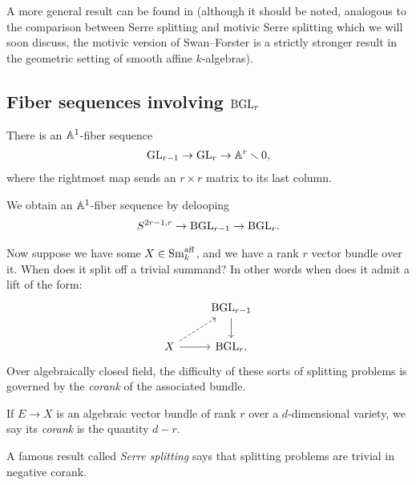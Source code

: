 \documentclass[11pt,openany]{book}
\providecommand{\aff}{\mathrm{aff}}
\begin{document}
\begin{remark} A more general result can be found in \cite{Swan-gens} (although it should be noted, analogous to the comparison between Serre splitting and motivic Serre splitting which we will soon discuss, the motivic version of Swan--Forster is a strictly stronger result in the geometric setting of smooth affine $k$-algebras).
\end{remark}



\subsection{Fiber sequences involving $\mathrm{BGL}_r$}

\begin{proposition} There is an $\mathbb{A}^1$-fiber sequence
\begin{align*}
    \mathrm{GL}_{r-1} \to \mathrm{GL}_r \to \mathbb{A}^r\smallsetminus 0,
\end{align*}
where the rightmost map sends an $r \times r$ matrix to its last column.
\end{proposition}

\begin{corollary} We obtain an $\mathbb{A}^1$-fiber sequence by delooping
\label{cor:BGL_deloop_fiber}
\begin{equation}\label{eqn:fiber-stabilization-BGLr}
\begin{aligned}
    S^{2r-1,r} \to \mathrm{BGL}_{r-1} \to \mathrm{BGL}_r.
\end{aligned}
\end{equation}
\end{corollary}

Now suppose we have some $X \in \Sm_k^\aff$, and we have a rank $r$ vector bundle over it. When does it split off a trivial summand? In other words when does it admit a lift of the form:
\[ \begin{tikzcd}
     & \BGL_{r-1}\dar\\
    X\rar\ar[ur,dashed] & \BGL_r.
\end{tikzcd} \]
%
Over algebraically closed field, the difficulty of these sorts of splitting problems is governed by the \textit{corank} of the associated bundle.

\begin{definition} If $E \to X$ is an algebraic vector bundle of rank $r$ over a $d$-dimensional variety, we say its \textit{corank} is the quantity $d-r$.
\end{definition}


A famous result called \textit{Serre splitting} says that splitting problems are trivial in negative corank.
\end{document}
